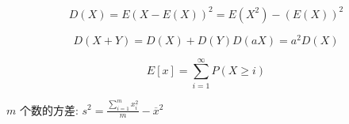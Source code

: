 \begin{equation}
    D(X)=E(X-E(X))^2=E\left(X^2\right)-(E(X))^2
\end{equation}

\begin{equation}
    D(X+Y)=D(X)+D(Y)D(aX)=a^2D(X)
\end{equation}

\begin{equation}
    E[x]=\sum_{i=1}^{\infty}P(X\geq i)
\end{equation}

\(m\) 个数的方差: \(\displaystyle s^2=\frac{\sum_{i=1}^m x_i^2}m-\overline x^2\)
